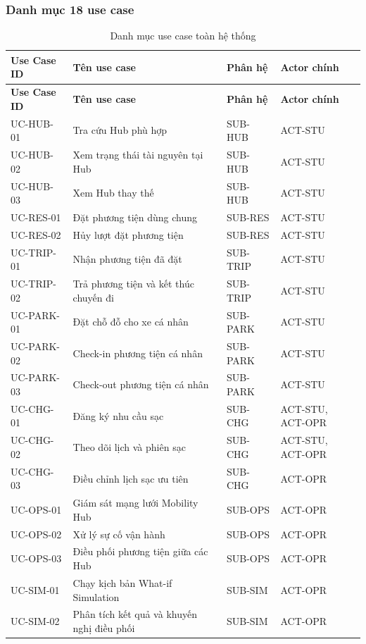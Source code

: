 \clearpage
\subsubsection{Danh mục 18 use case}

\begin{longtable}{|L{26mm}|L{58mm}|L{25mm}|L{25mm}|}
  \caption{Danh mục use case toàn hệ thống}\label{tab:system-use-cases}\\
  \hline
  \textbf{Use Case ID} & \centering\arraybackslash\textbf{Tên use case} & \textbf{Phân hệ} & \textbf{Actor chính}\\
  \hline
  \endfirsthead
  \hline
  \textbf{Use Case ID} & \centering\arraybackslash\textbf{Tên use case} & \textbf{Phân hệ} & \textbf{Actor chính}\\
  \hline
  \endhead
  UC-HUB-01 & Tra cứu Hub phù hợp & SUB-HUB & ACT-STU\\\hline
  UC-HUB-02 & Xem trạng thái tài nguyên tại Hub & SUB-HUB & ACT-STU\\\hline
  UC-HUB-03 & Xem Hub thay thế & SUB-HUB & ACT-STU\\\hline
  UC-RES-01 & Đặt phương tiện dùng chung & SUB-RES & ACT-STU\\\hline
  UC-RES-02 & Hủy lượt đặt phương tiện & SUB-RES & ACT-STU\\\hline
  UC-TRIP-01 & Nhận phương tiện đã đặt & SUB-TRIP & ACT-STU\\\hline
  UC-TRIP-02 & Trả phương tiện và kết thúc chuyến đi & SUB-TRIP & ACT-STU\\\hline
  UC-PARK-01 & Đặt chỗ đỗ cho xe cá nhân & SUB-PARK & ACT-STU\\\hline
  UC-PARK-02 & Check-in phương tiện cá nhân & SUB-PARK & ACT-STU\\\hline
  UC-PARK-03 & Check-out phương tiện cá nhân & SUB-PARK & ACT-STU\\\hline
  UC-CHG-01 & Đăng ký nhu cầu sạc & SUB-CHG & ACT-STU, ACT-OPR\\\hline
  UC-CHG-02 & Theo dõi lịch và phiên sạc & SUB-CHG & ACT-STU, ACT-OPR\\\hline
  UC-CHG-03 & Điều chỉnh lịch sạc ưu tiên & SUB-CHG & ACT-OPR\\\hline
  UC-OPS-01 & Giám sát mạng lưới Mobility Hub & SUB-OPS & ACT-OPR\\\hline
  UC-OPS-02 & Xử lý sự cố vận hành & SUB-OPS & ACT-OPR\\\hline
  UC-OPS-03 & Điều phối phương tiện giữa các Hub & SUB-OPS & ACT-OPR\\\hline
  UC-SIM-01 & Chạy kịch bản What-if Simulation & SUB-SIM & ACT-OPR\\\hline
  UC-SIM-02 & Phân tích kết quả và khuyến nghị điều phối & SUB-SIM & ACT-OPR\\\hline
\end{longtable}

